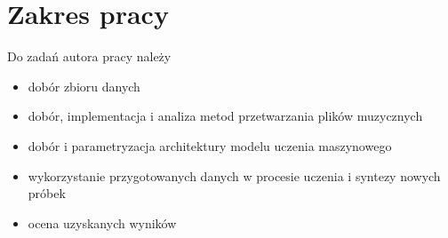 {    \section{Zakres pracy}
    {
        Do zadań autora pracy należy
        \begin{itemize}
            \item dobór zbioru danych
            \item dobór, implementacja i analiza metod przetwarzania plików muzycznych
            \item dobór i parametryzacja architektury modelu uczenia maszynowego
            \item wykorzystanie przygotowanych danych 
            w procesie uczenia i syntezy nowych próbek
            \item ocena uzyskanych wyników
        \end{itemize}
    }





}
